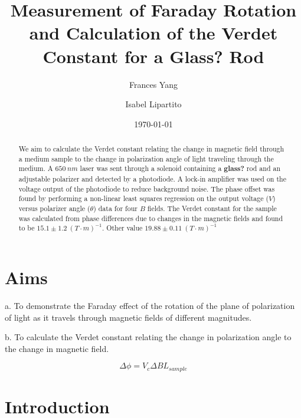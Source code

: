 \documentclass[prb,preprint]{revtex4-1}
\begin{document}
\title{Measurement of Faraday Rotation and Calculation of the Verdet Constant for a Glass? Rod}

\author{Frances Yang}

\author{Isabel Lipartito}

\date{\today}

\begin{abstract}
{We aim to calculate the Verdet constant relating the change in magnetic field through a medium sample to the change in polarization angle of light traveling through the medium.  A $650\ nm$ laser was sent through a solenoid containing a {\bf glass?} rod and an adjustable polarizer and detected by a photodiode. A lock-in amplifier was used on the voltage output of the photodiode to reduce background noise. The phase offset was found by performing a non-linear least squares regression on the output voltage ($V$) versus polarizer angle ($\theta$) data for four $B$ fields. The Verdet constant for the sample was calculated from phase differences due to changes in the magnetic fields and found to be $15.1 \pm 1.2 \ (T\cdot m)^{-1}$. Other value  $19.88 \pm 0.11 \ (T\cdot m)^{-1}$}
\end{abstract}

\maketitle 
\section{Aims}
{a.  To demonstrate the Faraday effect of the rotation of the plane of polarization of light as it travels through magnetic fields of different magnitudes.

b.  To calculate the Verdet constant relating the change in polarization angle to the change in magnetic field.}
\begin{equation}
\Delta \phi =V_{c} \Delta B L{_{sample}}
\end{equation}

\section{Introduction} 
\end{document}
